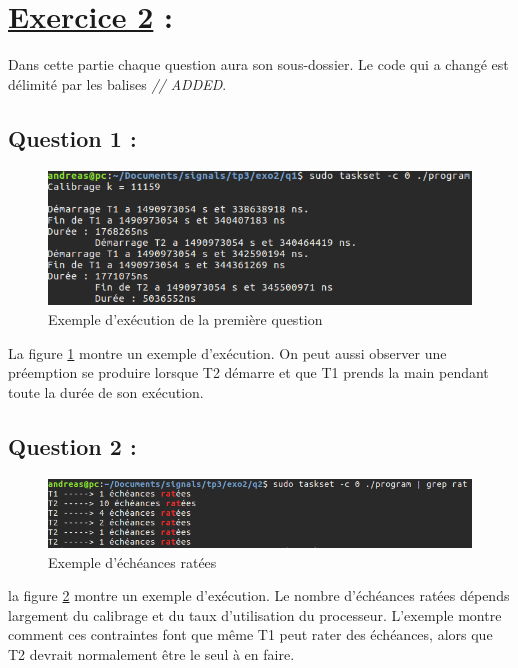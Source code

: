 \documentclass{article}
\begin{document}
\section*{\underline{Exercice 2} :}

Dans cette partie chaque question aura son sous-dossier. Le code qui a changé est délimité par les balises \textit{// ADDED}.
\subsection*{Question 1 :}

\begin{figure}
  \includegraphics[width=\linewidth]{2-1.png}
  \caption{Exemple d'exécution de la première question}
  \label{fig:2.1}
\end{figure}

La figure \ref{fig:2.1} montre un exemple d'exécution. On peut aussi observer une préemption se produire lorsque T2 démarre et que T1 prends la main pendant toute la durée de son exécution.

\subsection*{Question 2 :}

\begin{figure}
  \includegraphics[width=\linewidth]{2-2.png}
  \caption{Exemple d'échéances ratées}
  \label{fig:2.2}
\end{figure}

la figure \ref{fig:2.2} montre un exemple d'exécution. Le nombre d'échéances ratées dépends largement du calibrage et du taux d'utilisation du processeur. L'exemple montre comment ces contraintes font que même T1 peut rater des échéances, alors que T2 devrait normalement être le seul à en faire.
\end{document}
